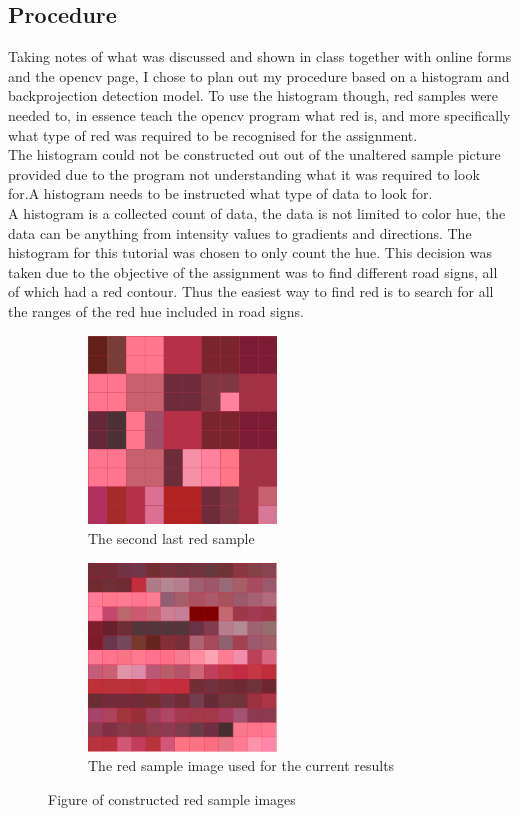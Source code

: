 \documentclass{article}
\begin{document}
\subsection{Procedure}\label{sec:intro}
Taking notes of what was discussed and shown in class together with online forms and the opencv page, I chose to plan out my procedure based on a histogram and backprojection detection model.
To use the histogram though, red samples were needed to, in essence teach the opencv program what red is, and more specifically what type of red was required to be recognised for the assignment.\\
The histogram could not be constructed out out of the unaltered sample picture provided due to the program not understanding what it was required to look for.A histogram needs to be instructed what type of data to look for.\\
A histogram is a collected count of data, the data is not limited to color hue, the data can be anything from intensity values to gradients and directions. The histogram for this tutorial was chosen to only count the hue. This decision was taken due to the objective of the assignment was to find different road signs, all of which had a red contour. Thus the easiest way to find red is to search for all the ranges of the red hue included in road 
signs.
\begin{figure}[H]
\begin{subfigure}{0.5\textwidth}
\includegraphics[width=0.9\linewidth, height=5cm]{ROADSIGN_samplered.png} 
\caption{The second last red sample}
\label{fig:subim1}
\end{subfigure}
\begin{subfigure}{0.5\textwidth}
\includegraphics[width=0.9\linewidth, height=5cm]{ROADSIGN_samplered2.png}
\caption{The red sample image used for the current results}
\label{fig:subim2}
\end{subfigure}
\caption{Figure of constructed red sample images}
\label{fig:image2}
\end{figure}
\end{document}
